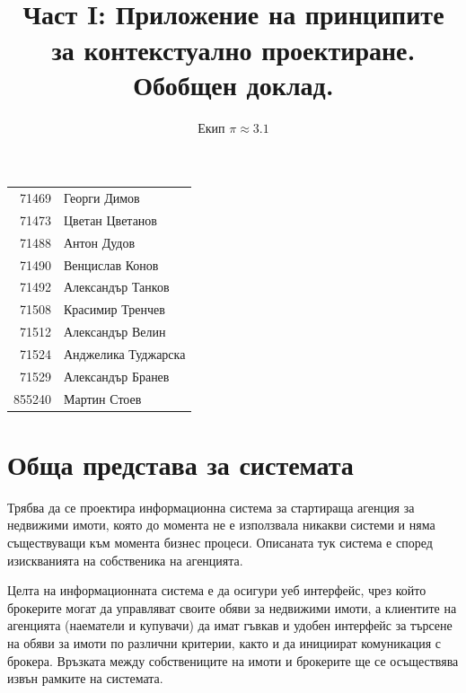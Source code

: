\documentclass[]{article}
\begin{document}
\title{\\Част I: Приложение на принципите за контекстуално проектиране. Обобщен доклад.}
\author{Екип $\pi \approx 3.1$}

\maketitle

\begin{center}

\begin{tabular}{r|l}
71469	& Георги Димов \\ %
71473	& Цветан Цветанов \\ %
71488	& Антон Дудов \\ %
71490	& Венцислав Конов \\ %
71492	& Александър Танков \\ %
71508	& Красимир Тренчев \\ %
71512	& Александър Велин \\ %
71524	& Анджелика Туджарска \\ %
71529	& Александър Бранев \\ %
855240	& Мартин Стоев \\ %
\end{tabular}

\end{center}

\clearpage

\tableofcontents
\clearpage

\section{Обща представа за системата} %
        
Трябва да се проектира информационна система за стартираща агенция за недвижими имоти, която до момента не е използвала никакви системи и няма съществуващи към момента бизнес процеси. Описаната тук система е според изискванията на собственика на агенцията.

Целта на информационната система е да осигури уеб интерфейс, чрез който брокерите могат да управляват своите обяви за недвижими имоти, а клиентите на агенцията (наематели и купувачи) да имат гъвкав и удобен интерфейс за търсене на обяви за имоти по различни критерии, както и да инициират комуникация с брокера. Връзката между собствениците на имоти и брокерите ще се осъществява извън рамките на системата.
\end{document}
